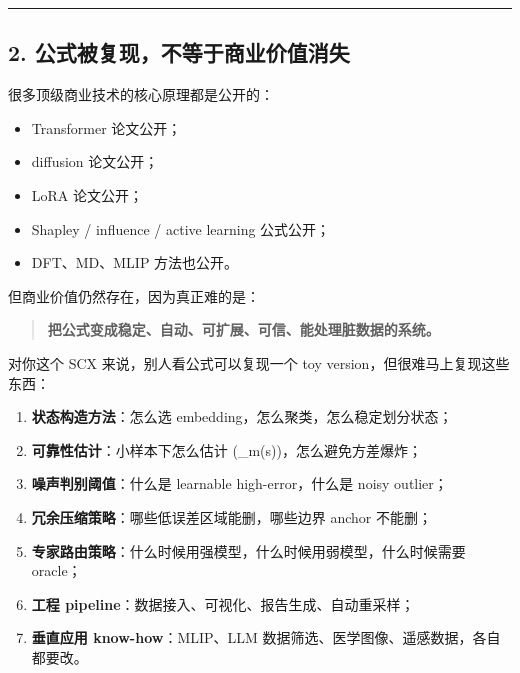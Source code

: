 \documentclass[
  12pt,
]{ctexart}
\providecommand{\tightlist}{%
  \setlength{\itemsep}{0pt}\setlength{\parskip}{0pt}}
\begin{document}
\begin{center}\rule{0.5\linewidth}{0.5pt}\end{center}

\subsection{2.
公式被复现，不等于商业价值消失}\label{ux516cux5f0fux88abux590dux73b0ux4e0dux7b49ux4e8eux5546ux4e1aux4ef7ux503cux6d88ux5931}

很多顶级商业技术的核心原理都是公开的：

\begin{itemize}
\tightlist
\item
  Transformer 论文公开；
\item
  diffusion 论文公开；
\item
  LoRA 论文公开；
\item
  Shapley / influence / active learning 公式公开；
\item
  DFT、MD、MLIP 方法也公开。
\end{itemize}

但商业价值仍然存在，因为真正难的是：

\begin{quote}
\textbf{把公式变成稳定、自动、可扩展、可信、能处理脏数据的系统。}
\end{quote}

对你这个 SCX 来说，别人看公式可以复现一个 toy
version，但很难马上复现这些东西：

\begin{enumerate}
\def\labelenumi{\arabic{enumi}.}
\tightlist
\item
  \textbf{状态构造方法}：怎么选 embedding，怎么聚类，怎么稳定划分状态；
\item
  \textbf{可靠性估计}：小样本下怎么估计
  (\_m(s))，怎么避免方差爆炸；
\item
  \textbf{噪声判别阈值}：什么是 learnable high-error，什么是 noisy
  outlier；
\item
  \textbf{冗余压缩策略}：哪些低误差区域能删，哪些边界 anchor 不能删；
\item
  \textbf{专家路由策略}：什么时候用强模型，什么时候用弱模型，什么时候需要
  oracle；
\item
  \textbf{工程 pipeline}：数据接入、可视化、报告生成、自动重采样；
\item
  \textbf{垂直应用 know-how}：MLIP、LLM
  数据筛选、医学图像、遥感数据，各自都要改。
\end{enumerate}
\end{document}
